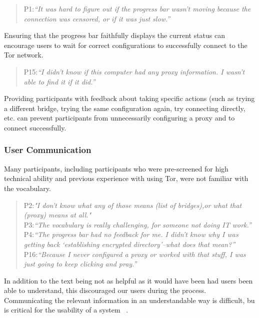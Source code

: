 \documentclass[USenglish,oneside,twocolumn]{article}
\begin{document}
\begin{quotation}
\noindent P1:\textit{``It was hard to figure out if the progress bar wasn't moving because the connection was censored, or if it was just slow.''}
\end{quotation}

Ensuring that the progress bar faithfully displays the current status can encourage users to wait for correct configurations to successfully connect to the Tor network. 

\begin{quotation}
\noindent P15:\textit{``I didn't know if this computer had any proxy information. I wasn't able to find it if it did.''}
\end{quotation}

Providing participants with feedback about taking specific actions (such as trying a different bridge, trying the same configuration again, try connecting directly, etc. can prevent participants from unnecessarily configuring a proxy and to connect successfully.\\

\subsubsection{User Communication} 
Many participants, including participants who were pre-screened for high technical ability and previous experience with using Tor, were not familiar with the vocabulary. 
\begin{quotation}
\noindent P2:\textit{"I don't know what any of those means (list of bridges),or what that (proxy)
 means at all."}\\
 
 \noindent P3:\textit{``The vocabulary is really challenging, for someone not doing IT work.''}\\
 
 \noindent P4:\textit{``The progress bar had no feedback for me. I didn't know why I was getting back `establishing encrypted directory'--what does that mean?''}\\
 
 \noindent P16:\textit{``Because I never configured a proxy or worked with that stuff, I was just going to keep clicking and pray.''}
\end{quotation} 
In addition to the text being not as helpful as it would have been had users been able to understand, this discouraged our users during the process. Communicating the relevant information in an understandable way is difficult, bu is critical for the usability of a system ~\cite{molich1990improving}.\\
\end{document}
